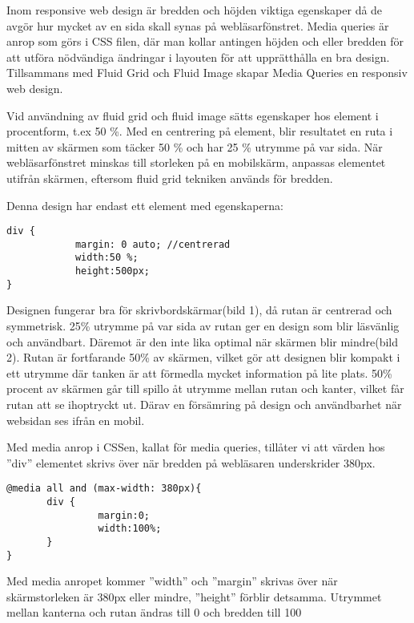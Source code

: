 \documentclass[11pt]{article}
\begin{document}
Inom responsive web design är bredden och höjden viktiga egenskaper då de avgör hur mycket av en sida skall synas på webläsarfönstret.  Media queries är anrop som görs i CSS filen, där man kollar antingen höjden och eller bredden för att utföra nödvändiga ändringar i layouten för att upprätthålla en bra design. Tillsammans med Fluid Grid och Fluid Image skapar Media Queries en responsiv web design. 

Vid användning av fluid grid och fluid image sätts egenskaper hos element i procentform, t.ex 50 \%. Med en centrering på element, blir resultatet en ruta i mitten av skärmen som täcker 50 \% och har 25 \% utrymme på var sida. När webläsarfönstret minskas till storleken på en mobilskärm, anpassas elementet utifrån skärmen, eftersom fluid grid tekniken används för bredden.

Denna design har endast ett element med egenskaperna:
\vspace{1cm}
\begin{verbatim}
div {	
	        margin: 0 auto; //centrerad
	        width:50 %;
	        height:500px;
}
\end{verbatim}
\vspace{1cm}
Designen fungerar bra för skrivbordskärmar(bild 1), då rutan är centrerad och symmetrisk. 25\% utrymme på var sida av rutan ger en design som blir läsvänlig och användbart. Däremot är den inte lika optimal när skärmen blir mindre(bild 2). Rutan är fortfarande 50\% av skärmen, vilket gör att  designen blir kompakt i ett utrymme där tanken är att förmedla mycket information på lite plats. 50\% procent av skärmen går till spillo åt utrymme mellan rutan och kanter, vilket får rutan att se ihoptryckt ut. Därav en försämring på design och användbarhet när websidan ses ifrån en mobil.

Med media anrop i CSSen, kallat för media queries, tillåter vi att värden hos ”div” elementet skrivs över när bredden på webläsaren underskrider 380px.

\vspace{1cm}
\begin{verbatim}
@media all and (max-width: 380px){
       div {
                margin:0;
                width:100%;
       }
}
\end{verbatim}
\vspace{1cm}

Med media anropet kommer ”width” och ”margin” skrivas över när skärmstorleken är 380px eller mindre, ”height” förblir detsamma. Utrymmet mellan kanterna och rutan ändras till 0 och bredden till 100%
\end{document}
